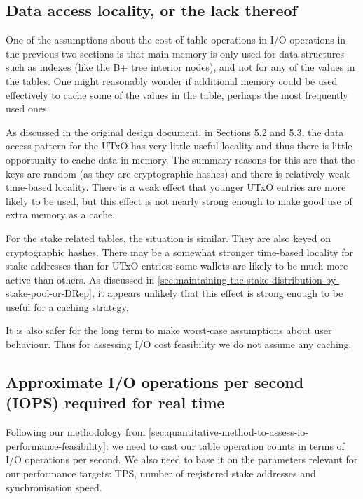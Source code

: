 \documentclass[11pt,a4paper]{article}
\begin{document}
\subsection{Data access locality, or the lack thereof}

One of the assumptions about the cost of table operations in I/O operations in
the previous two sections is that main memory is only used for data structures
such as indexes (like the B+ tree interior nodes), and not for any of the
values in the tables. One might reasonably wonder if additional memory could be
used effectively to cache some of the values in the table, perhaps the most
frequently used ones.

As discussed in the original design document, \cite{utxo-db} in Sections 5.2
and 5.3, the data access pattern for the UTxO has very little useful locality
and thus there is little opportunity to cache data in memory. The summary
reasons for this are that the keys are random (as they are cryptographic hashes)
and there is relatively weak time-based locality. There is a weak effect that
younger UTxO entries are more likely to be used, but this effect is not nearly
strong enough to make good use of extra memory as a cache.

For the stake related tables, the situation is similar. They are also keyed on
cryptographic hashes. There may be a somewhat stronger time-based locality for
stake addresses than for UTxO entries: some wallets are likely to be much more
active than others. As discussed in
\cref{sec:maintaining-the-stake-distribution-by-stake-pool-or-DRep}, it appears
unlikely that this effect is strong enough to be useful for a caching strategy.

It is also safer for the long term to make worst-case assumptions about user
behaviour. Thus for assessing I/O cost feasibility we do not assume any caching.


\subsection{Approximate I/O operations per second (IOPS) required for real time}

Following our methodology from
\cref{sec:quantitative-method-to-assess-io-performance-feasibility}: we need to
cast our table operation counts in terms of I/O operations per second. We also
need to base it on the parameters relevant for our performance targets: TPS,
number of registered stake addresses and synchronisation speed.
\end{document}
